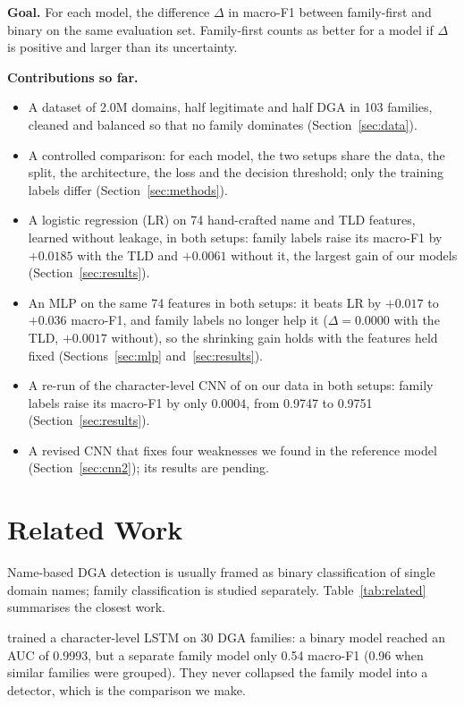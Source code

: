 \documentclass[11pt]{article}
\begin{document}
\textbf{Goal.} For each model, the difference $\Delta$ in macro-F1 between
family-first and binary on the same evaluation set. Family-first counts as better
for a model if $\Delta$ is positive and larger than its uncertainty.

\textbf{Contributions so far.}
\begin{itemize}
  \item A dataset of 2.0M domains, half legitimate and half DGA in 103 families,
  cleaned and balanced so that no family dominates (Section~\ref{sec:data}).
  \item A controlled comparison: for each model, the two setups share the data,
  the split, the architecture, the loss and the decision threshold; only the
  training labels differ (Section~\ref{sec:methods}).
  \item A logistic regression (LR) on 74 hand-crafted name and TLD features, learned
  without leakage, in both setups: family labels raise its macro-F1 by
  $+0.0185$ with the TLD and $+0.0061$ without it, the largest gain of our
  models (Section~\ref{sec:results}).
  \item An MLP on the same 74 features in both setups: it beats LR by $+0.017$ to
  $+0.036$ macro-F1, and family labels no longer help it ($\Delta = 0.0000$ with the
  TLD, $+0.0017$ without), so the shrinking gain holds with the features held fixed
  (Sections~\ref{sec:mlp} and~\ref{sec:results}).
  \item A re-run of the character-level CNN of
  \citet{gregorio2024incremental} on our data in both setups: family labels
  raise its macro-F1 by only $0.0004$, from 0.9747 to 0.9751
  (Section~\ref{sec:results}).
  \item A revised CNN that fixes four weaknesses we found in the reference model
  (Section~\ref{sec:cnn2}); its results are pending.
\end{itemize}

\section{Related Work}\label{sec:related}
Name-based DGA detection is usually framed as binary classification of single
domain names; family classification is studied separately. Table~\ref{tab:related}
summarises the closest work.

\citet{woodbridge2016lstm} trained a character-level LSTM on 30 DGA families: a
binary model reached an AUC of 0.9993, but a separate family model only 0.54
macro-F1 (0.96 when similar families were grouped). They never collapsed the
family model into a detector, which is the comparison we make.
\end{document}
